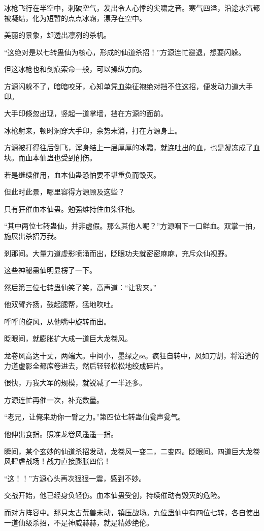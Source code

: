 \begin{this_body}
冰枪飞行在半空中，刺破空气，发出令人心悸的尖啸之音。寒气四溢，沿途水汽都被凝结，化为短暂的点点冰霜，漂浮在空中。

美丽的景象，却透出凛冽的杀机。

“这绝对是以七转蛊仙为核心，形成的仙道杀招！”方源连忙避退，想要闪躲。

但这冰枪也和剑痕索命一般，可以操纵方向。

方源闪躲不了，暗暗咬牙，心知单凭血染征袍绝对挡不住这招，便发动力道大手印。

大手印倏忽出现，竖起一道掌墙，挡在方源的面前。

冰枪射来，顿时洞穿大手印，余势未消，打在方源身上。

方源被打得往后倒飞，浑身结上一层厚厚的冰霜，就连吐出的血，也是凝冻成了血块。而血本仙蛊也受到创伤。

若是继续催用，血本仙蛊恐怕要不堪重负而毁灭。

但此时此景，哪里容得方源顾及这些？

只有狂催血本仙蛊。勉强维持住血染征袍。

“其中两位七转蛊仙，并非虚假。那么其他人呢？”方源咽下一口鲜血。双掌一拍，施展出杀招万我。

刹那间。大量力道虚影喷涌而出，眨眼功夫就密密麻麻，充斥众仙视野。

这些神秘蛊仙明显楞了一下。

然后第三位七转蛊仙笑了笑，高声道：“让我来。”

他双臂齐扬，鼓起腮帮，猛地吹吐。

呼呼的旋风，从他嘴中旋转而出。

眨眼间，就膨胀扩大成一道巨大龙卷风。

龙卷风高达十丈，两端大。中间小，墨绿之se。疯狂自转中，风如刀割，将沿途的力道虚影全都席卷进去，然后轻轻松松地绞成碎片。

很快，万我大军的规模，就锐减了一半还多。

方源连忙再催一次，补充数量。

“老兄，让俺来助你一臂之力。”第四位七转蛊仙瓮声瓮气。

他伸出食指。照准龙卷风遥遥一指。

瞬间，某个玄妙的仙道杀招发动，龙卷风一变二，二变四。眨眼间。四道巨大龙卷风肆虐战场！战力直接膨胀四倍！

“这！！”方源心头再次狠狠一震，感到不妙。

交战开始，他已经身负轻伤。血本仙蛊受创，持续催动有毁灭的危险。

而对方阵容中。那只太古荒兽未动，镇压战场。九位蛊仙中有四位七转，各自使出一道仙级杀招，不是神威赫赫，就是精妙绝伦。


\end{this_body}
